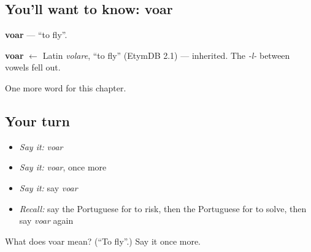 \subsection*{You'll want to know: voar}
\textbf{voar} — \textquotedblleft{}to fly\textquotedblright{}.

\begin{cousinweb}
\textbf{voar} $\leftarrow$ Latin \emph{volare}, \textquotedblleft{}to fly\textquotedblright{} (EtymDB 2.1) — inherited. The \emph{-l-} between vowels fell out.
\end{cousinweb}

\begin{grammarlens}[title={What you've built}]
One more word for this chapter.
\end{grammarlens}

\subsection*{Your turn}
\begin{itemize}
\raggedright
  \item \emph{Say it:} \emph{voar}
  \item \emph{Say it:} \emph{voar}, once more
  \item \emph{Say it:} say \emph{voar}
  \item \emph{Recall:} say the Portuguese for to risk, then the Portuguese for to solve, then say \emph{voar} again
\end{itemize}

\begin{tcolorbox}[breakable,colback=teal!4,colframe=teal!35!black,title={Before you move on}]
What does voar mean? (\textquotedblleft{}To fly\textquotedblright{}.) Say it once more.
\end{tcolorbox}
